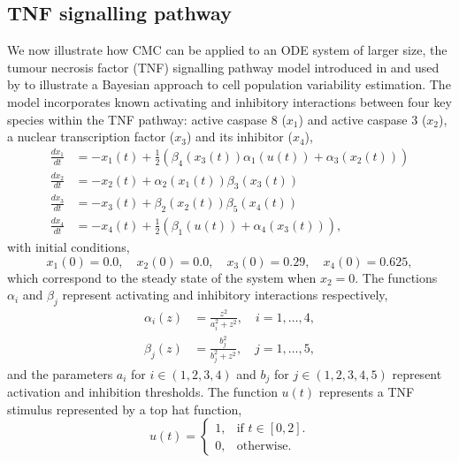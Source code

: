 \subsection{TNF signalling pathway}
We now illustrate how CMC can be applied to an ODE system of larger size, the tumour necrosis factor (TNF) signalling pathway model introduced in \cite{chaves2008bistable} and used by \cite{hasenauer2011identification} to illustrate a Bayesian approach to cell population variability estimation. The model incorporates known activating and inhibitory interactions between four key species within the TNF pathway: active caspase 8 ($x_1$) and active caspase 3 ($x_2$), a nuclear transcription factor ($x_3$) and its inhibitor ($x_4$),
%
\begin{equation}\label{eq:tnf}
\begin{aligned}
\frac{dx_1}{dt} &= -x_1(t) + \frac{1}{2}\left(\beta_4(x_3(t))\alpha_1(u(t)) + \alpha_3(x_2(t))\right)\\
\frac{dx_2}{dt} &= -x_2(t) + \alpha_2(x_1(t)) \beta_3(x_3(t))\\
\frac{dx_3}{dt} &= -x_3(t) + \beta_2(x_2(t)) \beta_5(x_4(t))\\
\frac{dx_4}{dt} &= -x_4(t) + \frac{1}{2}\left(\beta_1(u(t)) + \alpha_4(x_3(t))\right),
\end{aligned}
\end{equation}
%
with initial conditions,
\begin{equation}
x_1(0)=0.0, \quad x_2(0)=0.0, \quad x_3(0)=0.29, \quad x_4(0)=0.625,
\end{equation}
which correspond to the steady state of the system when $x_2=0$. The functions $\alpha_i$ and $\beta_j$ represent activating and inhibitory interactions respectively,
%
\begin{equation}
\begin{aligned}
\alpha_i(z) &= \frac{z^2}{a_i^2 + z^2}, \quad i=1, \dots, 4,\\
\beta_j(z)  &= \frac{b_j^2}{b_j^2 + z^2}, \quad j = 1, \dots, 5,
\end{aligned}
\end{equation}
%
and the parameters $a_i$ for $i\in(1,2,3,4)$ and $b_j$ for $j\in(1,2,3,4,5)$ represent activation and inhibition thresholds. The function $u(t)$ represents a TNF stimulus represented by a top hat function,
%
\begin{equation}
u(t)=\begin{cases}
1, & \text{if $t\in[0,2]$}.\\
0, & \text{otherwise}.
\end{cases}
\end{equation}
